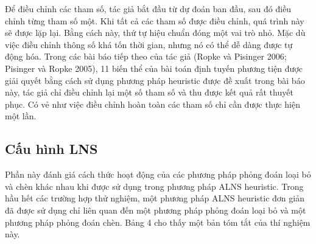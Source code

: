 Để điều chỉnh các tham số, tác giả bắt đầu từ dự đoán ban đầu, sau đó điều chỉnh từng tham số một. Khi tất cả các tham số được điều chỉnh, quá trình này sẽ được lặp lại. Bằng cách này, thứ tự hiệu chuẩn đóng một vai trò nhỏ. Mặc dù việc điều chỉnh thông số khá tốn thời gian, nhưng nó có thể dễ dàng được tự động hóa. Trong các bài báo tiếp theo của tác giả (Ropke và Pisinger 2006; Pisinger và Ropke 2005), 11 biến thể của bài toán định tuyến phương tiện được giải quyết bằng cách sử dụng phương pháp heuristic được đề xuất trong bài báo này, tác giả chỉ điều chỉnh lại một số tham số và thu được kết quả rất thuyết phục. Có vẻ như việc điều chỉnh hoàn toàn các tham số chỉ cần được thực hiện một lần.

\subsection{Cấu hình LNS}
Phần này đánh giá cách thức hoạt động của các phương pháp phỏng đoán loại bỏ và chèn khác nhau khi được sử dụng trong phương pháp ALNS heuristic. Trong hầu hết các trường hợp thử nghiệm, một phương pháp ALNS heuristic đơn giản đã được sử dụng chỉ liên quan đến một phương pháp phỏng đoán loại bỏ và một phương pháp phỏng đoán chèn. Bảng 4 cho thấy một bản tóm tắt của thí nghiệm này.

